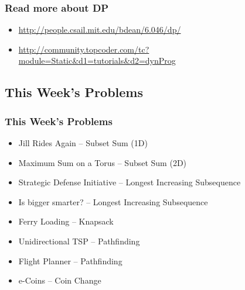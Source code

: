 \documentclass{beamer}
\begin{document}
\begin{frame}
   \frametitle{Read more about DP}
   \begin{itemize}
      \item \url{http://people.csail.mit.edu/bdean/6.046/dp/}
      \item \url{http://community.topcoder.com/tc?module=Static&d1=tutorials&d2=dynProg}
   \end{itemize}
\end{frame}

\subsection{This Week's Problems}
\begin{frame}
   \frametitle{This Week's Problems}
   \begin{itemize}
   \item Jill Rides Again -- Subset Sum (1D)
   \item Maximum Sum on a Torus -- Subset Sum (2D)
   \item Strategic Defense Initiative -- Longest Increasing Subsequence
   \item Is bigger smarter? -- Longest Increasing Subsequence
   \item Ferry Loading -- Knapsack
   \item Unidirectional TSP -- Pathfinding
   \item Flight Planner -- Pathfinding
   \item e-Coins -- Coin Change
   \end{itemize}
\end{frame}
\end{document}
